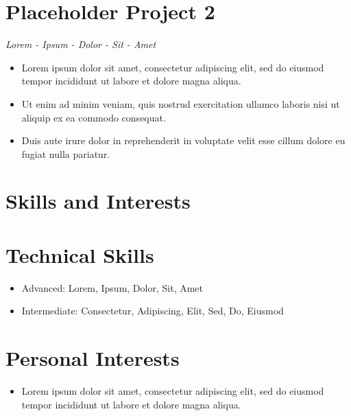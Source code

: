 \documentclass[8pt,letter]{article}%
\begin{document}
%
\vspace{0cm}%
\vspace{-0.4cm}%
\section*{\fontsize{10}{12}\selectfont\textbf{Placeholder Project 2}\hfill\textit{}}%
\label{sec:fontsize1012selectfonttextbfPlaceholderProject2hfilltextit}%
\vspace{-0.3cm}\textit{Lorem - Ipsum - Dolor - Sit - Amet}\hfill\textit{}\vspace{-0.1cm}%
\begin{itemize}%
\item%
Lorem ipsum dolor sit amet, consectetur adipiscing elit, sed do eiusmod tempor incididunt ut labore et dolore magna aliqua.%
\item%
Ut enim ad minim veniam, quis nostrud exercitation ullamco laboris nisi ut aliquip ex ea commodo consequat.%
\item%
Duis aute irure dolor in reprehenderit in voluptate velit esse cillum dolore eu fugiat nulla pariatur.%
\end{itemize}

%
\vspace{0cm}%
\vspace{-0.2cm}%
\section*{\large\textbf{Skills and Interests}}%
\vspace{-0.5cm}%
\noindent\makebox[\linewidth]{\rule{\linewidth}{0.4pt}}%
\vspace{-0.16cm}%
\vspace{-0.4cm}%
\section*{\fontsize{10}{12}\selectfont\textbf{Technical Skills}\hfill\textit{}}%
\label{sec:fontsize1012selectfonttextbfTechnicalSkillshfilltextit}%
\begin{itemize}%
\item%
Advanced: Lorem, Ipsum, Dolor, Sit, Amet%
\item%
Intermediate: Consectetur, Adipiscing, Elit, Sed, Do, Eiusmod%
\end{itemize}

%
\vspace{0cm}%
\vspace{-0.4cm}%
\section*{\fontsize{10}{12}\selectfont\textbf{Personal Interests}\hfill\textit{}}%
\label{sec:fontsize1012selectfonttextbfPersonalInterestshfilltextit}%
\begin{itemize}%
\item%
Lorem ipsum dolor sit amet, consectetur adipiscing elit, sed do eiusmod tempor incididunt ut labore et dolore magna aliqua.%
\end{itemize}

%
\vspace{0cm}%
\end{document}
